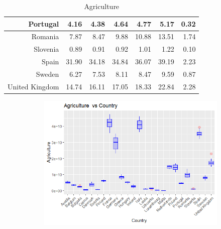 \documentclass[a4paper,twoside,10pt]{article}
\begin{document}
\begin{table}[H]
\begin{tabular}{|r|rrrrr|r|}
Portugal & 4.16 & 4.38 & 4.64 & 4.77 & 5.17 & 0.32 \\ \hline
Romania & 7.87 & 8.47 & 9.88 & 10.88 & 13.51 & 1.74 \\ 
Slovenia & 0.89 & 0.91 & 0.92 & 1.01 & 1.22 & 0.10 \\ 
Spain & 31.90 & 34.18 & 34.84 & 36.07 & 39.19 & 2.23 \\ 
Sweden & 6.27 & 7.53 & 8.11 & 8.47 & 9.59 & 0.87 \\ 
United Kingdom & 14.74 & 16.11 & 17.05 & 18.33 & 22.84 & 2.28 \\ 
\hline
	\end{tabular}
	\caption{Agriculture}
	\label{Agriculture}
\end{table}

\begin{figure}[H]
	\centering
	\begin{subfigure}[]{0.8\textwidth}
		\centering
		\includegraphics[width=1\linewidth]{images/Boxplot_Agriculture}
		\caption{}
		\label{fig:boxplot-Agriculture-vs-country}
	\end{subfigure}

\end{figure}

\newpage
\end{document}
